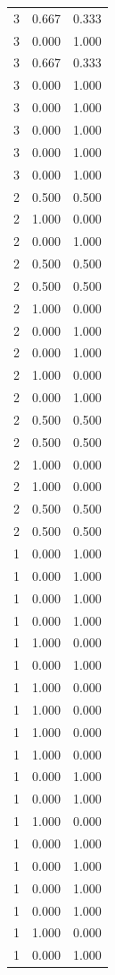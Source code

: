 \begin{tabular}{rrr}
3 & 0.667 & 0.333 \\
3 & 0.000 & 1.000 \\
3 & 0.667 & 0.333 \\
3 & 0.000 & 1.000 \\
3 & 0.000 & 1.000 \\
3 & 0.000 & 1.000 \\
3 & 0.000 & 1.000 \\
3 & 0.000 & 1.000 \\
2 & 0.500 & 0.500 \\
2 & 1.000 & 0.000 \\
2 & 0.000 & 1.000 \\
2 & 0.500 & 0.500 \\
2 & 0.500 & 0.500 \\
2 & 1.000 & 0.000 \\
2 & 0.000 & 1.000 \\
2 & 0.000 & 1.000 \\
2 & 1.000 & 0.000 \\
2 & 0.000 & 1.000 \\
2 & 0.500 & 0.500 \\
2 & 0.500 & 0.500 \\
2 & 1.000 & 0.000 \\
2 & 1.000 & 0.000 \\
2 & 0.500 & 0.500 \\
2 & 0.500 & 0.500 \\
1 & 0.000 & 1.000 \\
1 & 0.000 & 1.000 \\
1 & 0.000 & 1.000 \\
1 & 0.000 & 1.000 \\
1 & 1.000 & 0.000 \\
1 & 0.000 & 1.000 \\
1 & 1.000 & 0.000 \\
1 & 1.000 & 0.000 \\
1 & 1.000 & 0.000 \\
1 & 1.000 & 0.000 \\
1 & 0.000 & 1.000 \\
1 & 0.000 & 1.000 \\
1 & 1.000 & 0.000 \\
1 & 0.000 & 1.000 \\
1 & 0.000 & 1.000 \\
1 & 0.000 & 1.000 \\
1 & 0.000 & 1.000 \\
1 & 1.000 & 0.000 \\
1 & 0.000 & 1.000 \\

\end{tabular}
